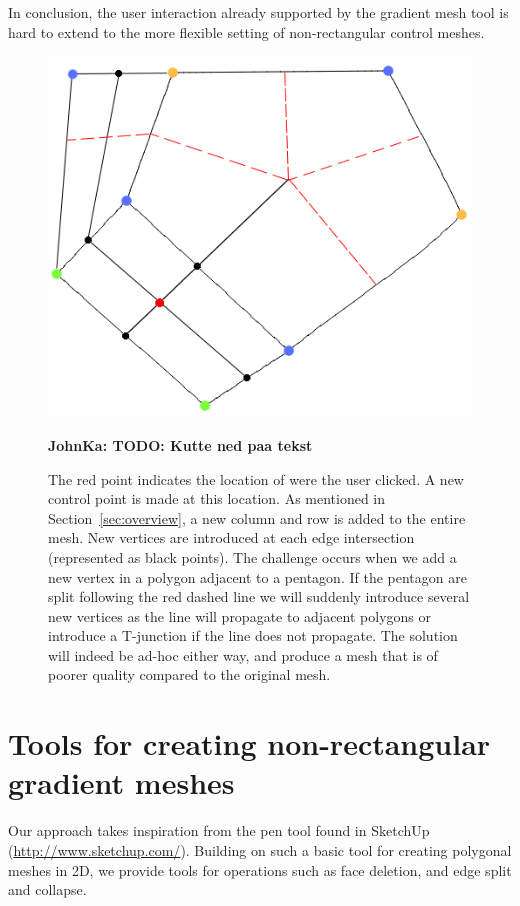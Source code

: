 \documentclass{egpubl}
\newcommand{\note}[3]{{\color{#2}\textbf{#1: #3}}}
\newcommand{\john}[1]{\note{JohnKa}{RubineRed}{#1}}
\begin{document}
	In conclusion, the user interaction already supported by the gradient mesh tool is hard to extend to the more flexible setting of non-rectangular control meshes.
	
	\begin{figure}[t]
		\centering
		\includegraphics[height=0.25\textheight]{pentagonMesh.png}
		\caption{The red point indicates the location of were the user clicked. A new control point is made at this location. As mentioned in Section~\ref{sec:overview}, a new column and row is added to the entire mesh. New vertices are introduced at each edge intersection (represented as black points). The challenge occurs when we add a new vertex in a polygon adjacent to a pentagon. If the pentagon are split following the red dashed line we will suddenly introduce several new vertices as the line will propagate to adjacent polygons or introduce a T-junction if the line does not propagate. The solution will indeed be ad-hoc either way, and produce a mesh that is of poorer quality compared to the original mesh.
		}
		\john{TODO: Kutte ned paa tekst}
		\label{fig:adHocPentagon}
	\end{figure}
	
	\section{Tools for creating non-rectangular gradient meshes}
	\label{sec:method}
	
	Our approach takes inspiration from the pen tool found in SketchUp (\url{http://www.sketchup.com/}). Building on such a basic tool for creating polygonal meshes in 2D, we provide tools for operations such as face deletion, and edge split and collapse.
	
\end{document}
